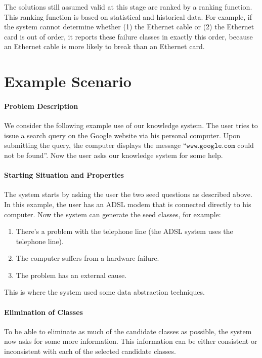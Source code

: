 \documentclass[a4paper,11pt]{article}
\begin{document}
The solutions still assumed valid at this stage are ranked by a ranking
function. This ranking function is based on statistical and historical data.
For example, if the system cannot determine whether (1) the Ethernet cable or
(2) the Ethernet card is out of order, it reports these failure classes in
exactly this order, because an Ethernet cable is more likely to break than an
Ethernet card.


\section*{Example Scenario}

\paragraph{Problem Description}

We consider the following example use of our knowledge system. The user tries
to issue a search query on the Google website via his personal computer. Upon
submitting the query, the computer displays the message
``$\texttt{www.google.com}$ could not be found''. Now the user asks our
knowledge system for some help.

\paragraph{Starting Situation and Properties}

The system starts by asking the user the two seed questions as described
above. In this example, the user has an ADSL modem that is connected directly
to his computer. Now the system can generate the seed classes, for example:
\begin{enumerate}
\item There's a problem with the telephone line (the ADSL system uses the
  telephone line).
\item The computer suffers from a hardware failure.
\item The problem has an external cause.
\end{enumerate}
This is where the system used some data abstraction techniques.

\paragraph{Elimination of Classes}

To be able to eliminate as much of the candidate classes as possible, the
system now asks for some more information. This information can be either
consistent or inconsistent with each of the selected candidate classes.
\end{document}
